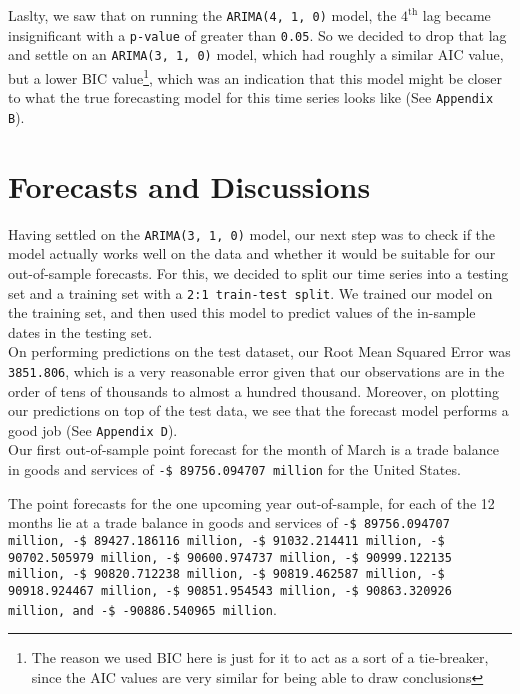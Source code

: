 \documentclass[12pt]{article}
\begin{document}
Laslty, we saw that on running the \texttt{ARIMA(4, 1, 0)} model, the $4^\text{th}$ lag became insignificant with a \texttt{p-value} of greater than \texttt{0.05}. So we decided to drop that lag and settle on an \texttt{ARIMA(3, 1, 0)} model, which had roughly a similar AIC value, but a lower BIC value\footnote{The reason we used BIC here is just for it to act as a sort of a tie-breaker, since the AIC values are very similar for being able to draw conclusions}, which was an indication that this model might be closer to what the true forecasting model for this time series looks like (See \texttt{Appendix B}).

\section{Forecasts and Discussions}

Having settled on the \texttt{ARIMA(3, 1, 0)} model, our next step was to check if the model actually works well on the data and whether it would be suitable for our out-of-sample forecasts. For this, we decided to split our time series into a testing set and a training set with a \texttt{2:1 train-test split}. We trained our model on the training set, and then used this model to predict values of the in-sample dates in the testing set.\\

On performing predictions on the test dataset, our Root Mean Squared Error\cite{rmse} was \texttt{3851.806}, which is a very reasonable error given that our observations are in the order of tens of thousands to almost a hundred thousand. Moreover, on plotting our predictions on top of the test data, we see that the forecast model performs a good job (See \texttt{Appendix D}).\\

Our first out-of-sample point forecast for the month of March is a trade balance in goods and services of \texttt{-\$ 89756.094707 million} for the United States. 

The point forecasts for the one upcoming year out-of-sample, for each of the 12 months lie at a trade balance in goods and services of \texttt{-\$ 89756.094707 million, -\$ 89427.186116 million, -\$ 91032.214411 million, -\$ 90702.505979 million, -\$ 90600.974737 million, -\$ 90999.122135 million, -\$ 90820.712238 million, -\$ 90819.462587 million, -\$ 90918.924467 million, -\$ 90851.954543 million, -\$ 90863.320926 million, and -\$ -90886.540965 million}.\\
\end{document}

